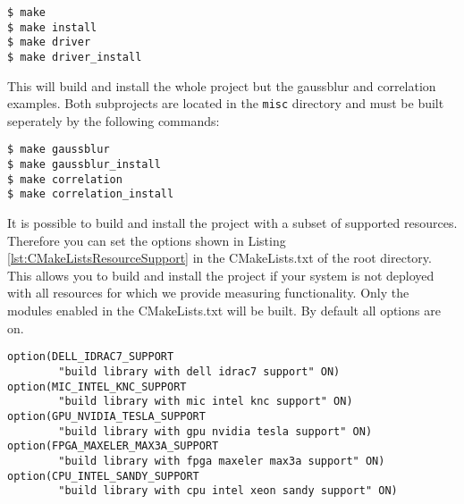 \begin{lstlisting}[caption={Default build instructions.}, label=lst:Make]
$ make
$ make install
$ make driver
$ make driver_install
\end{lstlisting}

This will build and install the whole project but the gaussblur and correlation examples. Both subprojects are located in the \texttt{misc} directory and must be built seperately by the following commands:

\pagebreak

\begin{lstlisting}[caption={Default build instructions for additional applications. Note, that you need the PGI OpenACC compiler as well as Nvidia's \texttt{nvcc}.}, label=lst:MakeApps]
$ make gaussblur
$ make gaussblur_install
$ make correlation
$ make correlation_install
\end{lstlisting}

It is possible to build and install the project with a subset of supported resources. Therefore you can set the options shown in Listing \ref{lst:CMakeListsResourceSupport} in the CMakeLists.txt of the root directory. This allows you to build and install the project if your system is not deployed with all resources for which we provide measuring functionality. Only the modules enabled in the CMakeLists.txt will be built. By default all options are on.
\begin{lstlisting}[caption={CMakeLists.txt options.}, label=lst:CMakeListsResourceSupport]
option(DELL_IDRAC7_SUPPORT
		"build library with dell idrac7 support" ON)
option(MIC_INTEL_KNC_SUPPORT 
		"build library with mic intel knc support" ON)
option(GPU_NVIDIA_TESLA_SUPPORT 
		"build library with gpu nvidia tesla support" ON)
option(FPGA_MAXELER_MAX3A_SUPPORT 
		"build library with fpga maxeler max3a support" ON)
option(CPU_INTEL_SANDY_SUPPORT 
		"build library with cpu intel xeon sandy support" ON)
\end{lstlisting}

